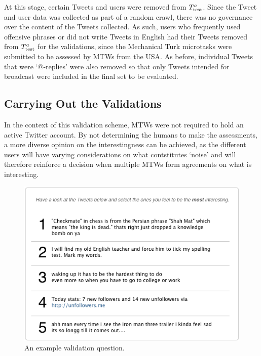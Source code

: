 At this stage, certain Tweets and users were removed from $T^a_{\textrm{test}}{}$. Since the Tweet and user data was collected as part of a random crawl, there was no governance over the content of the Tweets collected. As such, users who frequently used offensive phrases or did not write Tweets in English had their Tweets removed from $T^a_{\textrm{test}}{}$ for the validations, since the Mechanical Turk microtasks were submitted to be assessed by MTWs from the USA. As before, individual Tweets that were `@-replies' were also removed so that only Tweets intended for broadcast were included in the final set to be evaluated.



\subsection{Carrying Out the Validations}
In the context of this validation scheme, MTWs were not required to hold an active Twitter account. By not determining the humans to make the assessments, a more diverse opinion on the interestingness can be achieved, as the different users will have varying considerations on what contstitutes `noise' and will therefore reinforce a decision when multiple MTWs form agreements on what is interesting. 

\begin{figure}[h]
\centering
\includegraphics[scale=0.7]{5.Chapter3/Media/questions1.png} 
\caption{An example validation question.}
\label{fig:example_question1}
\end{figure}

